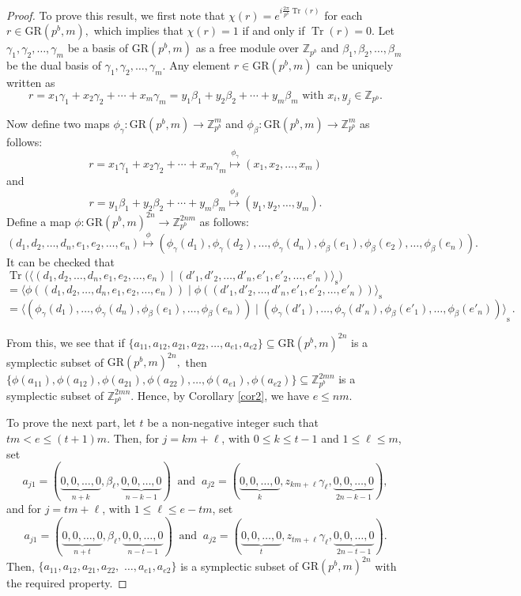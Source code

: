 \documentclass{article}
\DeclareMathOperator{\Tr}{Tr}
\theoremstyle{remark}
\theoremstyle{definition}
\numberwithin{equation}{section}
\begin{document}
\begin{proof} To prove this result, we first note that $\chi(r)=e^{i \frac{2\pi}{p^b}  {\Tr}(r)}$ for each $r \in \text{GR}(p^b,m),$ which implies that $\chi(r)=1$ if and only if ${\Tr}(r)=0.$ Let $\gamma_1,\gamma_2,\ldots,\gamma_m$ be a  basis of $\text{GR}(p^b,m)$ as a free module over $\mathbb{Z}_{p^b}$ and $\beta_1,\beta_2,\ldots,\beta_m$ be the dual basis of $\gamma_1,\gamma_2,\ldots,\gamma_m.$ Any element $r \in \text{GR}(p^b,m)$ can be uniquely written as $$r=x_1\gamma_1+x_2\gamma_2+\cdots+x_{m}\gamma_{m}=y_1\beta_1+y_2\beta_2+\cdots+y_{m}\beta_{m} \text{~with~} x_i, y_j \in \mathbb{Z}_{p^b}.$$

 Now define two maps $\phi_\gamma: \text{GR}(p^b,m) \to \mathbb{Z}_{p^b}^m$ and
$\phi_\beta: \text{GR}(p^b,m) \to \mathbb{Z}_{p^b}^m$ as follows:
$$r=x_1\gamma_1+x_2\gamma_2+\cdots+x_{m}\gamma_{m}   \stackrel{\phi_\gamma}{\longmapsto}  (x_1,x_2,\ldots,x_m)$$ 
and $$r=y_1\beta_1+y_2\beta_2+\cdots+y_{m}\beta_{m}\stackrel{\phi_\beta}{\longmapsto}  (y_1,y_2,\ldots,y_m).$$ 
%
Define a map $\phi: \text{GR}(p^b,m) ^{2n} \to \mathbb{Z}_{p^b}^{2nm}$ as follows:
$$(d_1,d_2,\ldots,d_n,e_1,e_2,\ldots,e_n) \stackrel{\phi}{\longmapsto} (\phi_\gamma(d_1),\phi_\gamma(d_2),\ldots,\phi_\gamma(d_n),\phi_\beta(e_1),\phi_\beta(e_2),\ldots,\phi_\beta(e_n)).$$
It can be checked that $${\Tr}\bigl({\langle (d_1,d_2,\ldots,d_n,e_1,e_2,\ldots,e_n) \mid (d'_1,d'_2,\ldots,d'_n,e'_1,e'_2,\ldots,e'_n) \rangle}_{\mathrm{s}}\bigr)~~~~~~~~~~~~~~~~~~~~~~~~~~~~~~~~~~~~~~~~~~~~~~~~~~~~$$ 
$$={\langle  \phi((d_1,d_2,\ldots,d_n,e_1,e_2,\ldots,e_n)) \mid \phi((d'_1,d'_2,\ldots,d'_n,e'_1,e'_2,\ldots,e'_n)) \rangle}_{\mathrm{s}}~~~~~~~~~~~~~~~~~~~~~ \, $$
$$={\langle (\phi_\gamma(d_1),\ldots,\phi_\gamma(d_n),\phi_\beta(e_1),\ldots,\phi_\beta(e_n)) \mid (\phi_\gamma(d'_1),\ldots,\phi_\gamma(d'_n),\phi_\beta(e'_1),\ldots,\phi_\beta(e'_n)) \rangle}_{\mathrm{s}} \, . $$

From this, we see that if $\{a_{11},a_{12},a_{21},a_{22},\ldots,a_{e1},a_{e2}\} \subseteq \text{GR}(p^b,m)^{2n}$ is a symplectic subset of $\text{GR}(p^b,m)^{2n},$ then $\{\phi(a_{11}),\phi(a_{12}),\phi(a_{21}),\phi(a_{22}),\ldots,\phi(a_{e1}),\phi(a_{e2})\} \subseteq \mathbb{Z}_{p^b}^{2mn}$ is a symplectic subset of $\mathbb{Z}_{p^b}^{2mn}$. Hence, by Corollary \ref{cor2}, we have $e \leq nm.$ 

To prove the next part,  let $t $ be a non-negative integer such that $tm < e \leq (t+1)m$. Then, for $j = km+ \ell$, with $0 \le k \le t-1$ and $1 \le \ell \le m$, set 
$$
a_{j1} =  (\underbrace{ 0,0,\ldots,0}_{n+k},\beta_{\ell},\underbrace{ 0,0,\ldots,0}_{n-k-1})\ \text{ and } \ a_{j2} =(\underbrace{ 0,0,\ldots,0}_{k},z_{km+\ell}\gamma_{\ell},\underbrace{ 0,0,\ldots,0}_{2n-k-1})  , 
$$
and for $j = tm + \ell$, with $1 \le \ell \le e-tm$, set
$$
a_{j1} =(\underbrace{ 0,0,\ldots,0}_{n+t},\beta_{\ell},\underbrace{ 0,0,\ldots,0}_{n-t-1})  \ \text{ and } \ a_{j2} = (\underbrace{ 0,0,\ldots,0}_{t},z_{tm+\ell}\gamma_{\ell},\underbrace{ 0,0,\ldots,0}_{2n-t-1})  .
$$ 
Then, $\{a_{11},a_{12},a_{21},a_{22},$ $\ldots,a_{e1},a_{e2}\}$ is a symplectic subset of $\text{GR}(p^b,m)^{2n}$ with the required property.
\end{proof}
\end{document}
